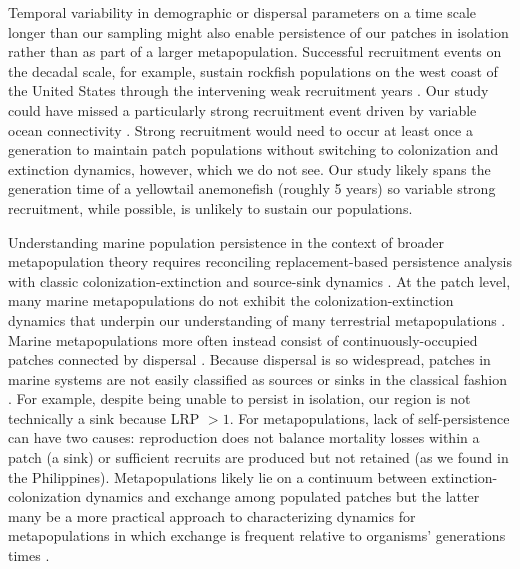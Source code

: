 \documentclass[12pt, oneside]{article}   	%
\begin{document}
Temporal variability in demographic or dispersal parameters on a time scale longer than our sampling might also enable persistence of our patches in isolation \citep[similar to the storage effect,][]{warner1985coexistence} rather than as part of a larger metapopulation. Successful recruitment events on the decadal scale, for example, sustain rockfish populations on the west coast of the United States through the intervening weak recruitment years \citep[e.g.][]{tolimieri2005roles}. Our study could have missed a particularly strong recruitment event driven by variable ocean connectivity \citep[simulations suggest that 20 years are necessary to capture the full extent of ocean variability in the Coral Triangle region surrounding our patches;][]{thompson2018variability}. Strong recruitment would need to occur at least once a generation to maintain patch populations without switching to colonization and extinction dynamics, however, which we do not see. Our study likely spans the generation time of a yellowtail anemonefish (roughly 5 years) so variable strong recruitment, while possible, is unlikely to sustain our populations.

Understanding marine population persistence in the context of broader metapopulation theory requires reconciling replacement-based persistence analysis with classic colonization-extinction and source-sink dynamics \citep{sale2006merging}. At the patch level, many marine metapopulations do not exhibit the colonization-extinction dynamics \citep[or do only on a decades to centuries timescale,][]{smedbol2002myths} that underpin our understanding of many terrestrial metapopulations \citep[e.g,][]{hanski1998metapopulation, moilanen1998long}. Marine metapopulations more often instead consist of continuously-occupied patches connected by dispersal \citep{kritzer2006marine}. Because dispersal is so widespread, patches in marine systems are not easily classified as sources or sinks in the classical fashion \citep{figueira2006defining, white2011oceanographic}. For example, despite being unable to persist in isolation, our region is not technically a sink \citep{pulliam1988sources} because LRP $> 1$. For metapopulations, lack of self-persistence can have two causes: reproduction does not balance mortality losses within a patch (a sink) or sufficient recruits are produced but not retained (as we found in the Philippines). Metapopulations likely lie on a continuum between extinction-colonization dynamics and exchange among populated patches \citep{kritzer2006marine} but the latter many be a more practical approach to characterizing dynamics for metapopulations in which exchange is frequent relative to organisms' generations times \citep{hastings_persistence_2006}. 
\end{document}
